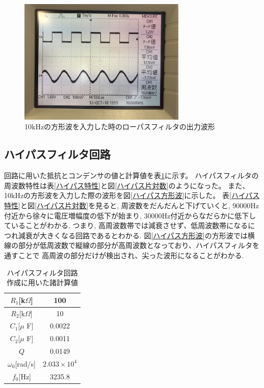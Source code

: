 \documentclass[a4paper,11pt,uplatex]{jsarticle}
\begin{document}
\begin{figure}[H]
	\begin{center}
		\includegraphics[width=8cm]{画像/ローパス方形波.jpg}
		\caption{10kHzの方形波を入力した時のローパスフィルタの出力波形}
		\label{ローパス方形波}
	\end{center}
\end{figure}

\subsection{ハイパスフィルタ回路}
回路に用いた抵抗とコンデンサの値と計算値を表\ref{ハイパス計算}に示す。
ハイパスフィルタの周波数特性は表\ref{ハイパス特性}と図\ref{ハイパス片対数}のようになった。
また、10kHzの方形波を入力した際の波形を図\ref{ハイパス方形波}に示した。
表\ref{ハイパス特性}と図\ref{ハイパス片対数}を見ると, 周波数をだんだんと下げていくと, 90000Hz付近から徐々に電圧増幅度の低下が始まり,
30000Hz付近からなだらかに低下していることがわかる. つまり, 高周波数帯では減衰させず、低周波数帯になるにつれ減衰が大きくなる回路であるとわかる.
図\ref{ハイパス方形波}の方形波では横線の部分が低周波数で縦線の部分が高周波数となっており、ハイパスフィルタを通すことで
高周波の部分だけが検出され、尖った波形になることがわかる.
\begin{table}[H]
	\caption{ハイパスフィルタ回路作成に用いた諸計算値}
	\label{ハイパス計算}
	\begin{center}
    \begin{tabular}[H]{|c|c|}\hline
      $R_1$[k$\Omega$] & 100 \\ \hline
      $R_2$[k$\Omega$] & 10\\ \hline
      $C_1$[$\mu$ F] & 0.0022\\ \hline
      $C_2$[$\mu$ F] & 0.0011 \\\hline
      $Q$ & 0.0149 \\ \hline
      $\omega_0$[rad/s] & $2.033\times10^4$ \\ \hline
      $f_0$[Hz] & 3235.8\\ \hline
    \end{tabular}
\end{center}
\end{table}
\end{document}
